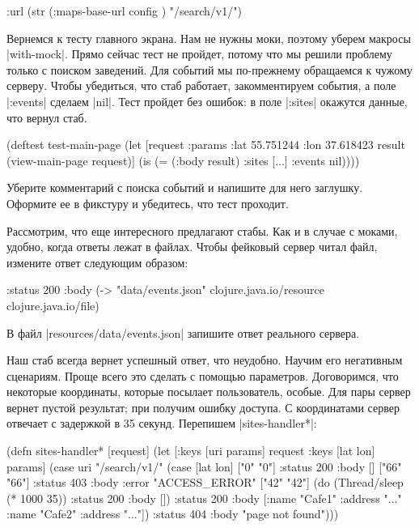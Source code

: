 \begin{english}
  \begin{clojure}
{:url (str (:maps-base-url config ) "/search/v1/")}
  \end{clojure}
\end{english}

Вернемся к тесту главного экрана. Нам не нужны моки, поэтому уберем макросы
\spverb|with-mock|. Прямо сейчас тест не пройдет, потому что мы решили проблему
только с поиском заведений. Для событий мы по-прежнему обращаемся к чужому
серверу. Чтобы убедиться, что стаб работает, закомментируем события, а поле
\spverb|:events| сделаем \spverb|nil|. Тест пройдет без ошибок: в поле
\spverb|:sites| окажутся данные, что вернул стаб.

\begin{english}
  \begin{clojure}
(deftest test-main-page
  (let [request {:params {:lat 55.751244
                          :lon 37.618423}}
        result (view-main-page request)]
    (is (= (:body result) {:sites [...] :events nil}))))
  \end{clojure}
\end{english}

Уберите комментарий с поиска событий и напишите для него заглушку. Оформите ее в
фикстуру и убедитесь, что тест проходит.

Рассмотрим, что еще интересного предлагают стабы. Как и в случае с моками,
удобно, когда ответы лежат в файлах. Чтобы фейковый сервер читал файл, измените
ответ следующим образом:

\begin{english}
  \begin{clojure}
{:status 200
 :body (-> "data/events.json"
           clojure.java.io/resource
           clojure.java.io/file)}
  \end{clojure}
\end{english}

В файл \spverb|resources/data/events.json| запишите ответ реального сервера.

Наш стаб всегда вернет успешный ответ, что неудобно. Научим его негативным
сценариям. Проще всего это сделать с помощью параметров. Договоримся, что
некоторые координаты, которые посылает пользователь, особые. Для пары
 сервер вернет пустой результат; при  получим ошибку
доступа. С координатами  сервер отвечает с задержкой в 35
секунд. Перепишем \spverb|sites-handler*|:

\begin{english}
  \begin{clojure}
(defn sites-handler* [request]
  (let [{:keys [uri params]} request
        {:keys [lat lon]} params]
    (case uri
      "/search/v1/"
      (case [lat lon]
        ["0" "0"]   {:status 200 :body []}
        ["66" "66"] {:status 403 :body {:error "ACCESS_ERROR"}}
        ["42" "42"] (do (Thread/sleep (* 1000 35))
                        {:status 200 :body []})
        {:status 200
         :body [{:name "Cafe1" :address "..."}
                {:name "Cafe2" :address "..."}]})
      {:status 404 :body "page not found"})))
  \end{clojure}
\end{english}

